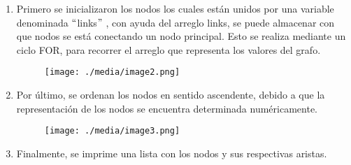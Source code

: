 \documentclass[12pt]{article}
\renewcommand{\_}{\kern-1.5pt\textunderscore\kern-1.5pt}
\begin{document}
\begin{enumerate}
	\item Primero se inicializaron los nodos los cuales están unidos por una variable denominada $``$links$"$ , con ayuda del arreglo links, se puede almacenar con que nodos se está conectando un nodo principal. Esto se realiza mediante un ciclo FOR, para recorrer el arreglo que representa los valores del grafo.\par




\begin{figure}[H]
	\begin{Center}
		\texttt{[image: ./media/image2.png]}
	\end{Center}
\end{figure}



\par

	\item Por último, se ordenan los nodos en sentido ascendente, debido a que la representación de los nodos se encuentra determinada numéricamente.\par




\begin{figure}[H]
	\begin{Center}
		\texttt{[image: ./media/image3.png]}
	\end{Center}
\end{figure}



\par


\vspace{\baselineskip}

\vspace{\baselineskip}

\vspace{\baselineskip}

\vspace{\baselineskip}

\vspace{\baselineskip}

\vspace{\baselineskip}

\vspace{\baselineskip}

\vspace{\baselineskip}
	\item Finalmente, se imprime una lista con los nodos y sus respectivas aristas.
\end{enumerate}\par
\end{document}
